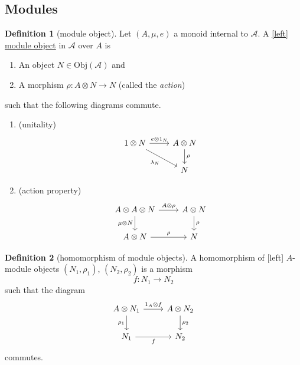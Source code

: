 \documentclass[a4paper,10pt]{scrreprt}
\newcommand{\defn}[1]{\ul{#1}}
\newcommand{\Obj}{\mathrm{Obj}}
\theoremstyle{definition}
\newtheorem{definition}{Definition}[section]
\theoremstyle{plain}
\theoremstyle{remark}
\begin{document}
\subsection{Modules}
\begin{definition}[module object]
  \label{def:moduleobject}
  Let $(A, \mu, e)$ a monoid internal to $\mathscr{A}$. A \defn{[left] module object} in $\mathscr{A}$ over $A$ is
  \begin{enumerate}
    \item An object $N \in \Obj(\mathscr{A})$ and

    \item A morphism $\rho\colon A \otimes N \to N$ (called the \emph{action})
  \end{enumerate}
  such that the following diagrams commute.
  \begin{enumerate}
    \item (unitality)
      \begin{equation*}
        \begin{tikzcd}
          1 \otimes N
          \arrow[r, "e \otimes 1_{N}"]
          \arrow[dr, swap, "\lambda_{N}"]
          & A \otimes N
          \arrow[d, "\rho"]
          \\
          & N
        \end{tikzcd}
      \end{equation*}

    \item (action property)
      \begin{equation*}
        \begin{tikzcd}
          A \otimes A \otimes N
          \arrow[d, swap, "\mu \otimes N"]
          \arrow[r, "A \otimes \rho"]
          & A \otimes N
          \arrow[d, "\rho"]
          \\
          A \otimes N
          \arrow[r, "\rho"]
          & N
        \end{tikzcd}
      \end{equation*}
  \end{enumerate}
\end{definition}

\begin{definition}[homomorphism of module objects]
  \label{def:homomorphismofmoduleobjects}
  A homomorphism of [left] $A$-module objects $(N_{1}, \rho_{1})$, $(N_{2}, \rho_{2})$ is a morphism
  \begin{equation*}
    f\colon N_{1} \to N_{2}
  \end{equation*}
  such that the diagram
  \begin{equation*}
    \begin{tikzcd}
      A \otimes N_{1}
      \arrow[r, "1_{A} \otimes f"]
      \arrow[d, swap, "\rho_{1}"]
      & A \otimes N_{2}
      \arrow[d, "\rho_{2}"]
      \\
      N_{1}
      \arrow[r, swap, "f"]
      & N_{2}
    \end{tikzcd}
  \end{equation*}
  commutes.
\end{definition}
\end{document}
